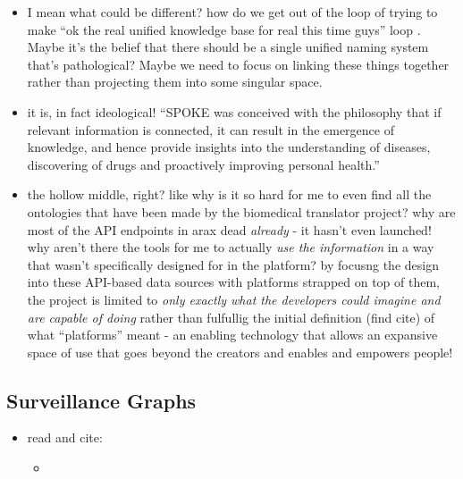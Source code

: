 \begin{itemize}

\item
  I mean what could be different? how do we get out of the loop of
  trying to make ``ok the real unified knowledge base for real this time
  guys'' loop \cite{hoytUnifyingIdentificationBiomedical2022} .
  Maybe it's the belief that there should be a single unified naming
  system that's pathological? Maybe we need to focus on linking these
  things together rather than projecting them into some singular space.
\item
  it is, in fact ideological! ``SPOKE was conceived with the philosophy
  that if relevant information is connected, it can result in the
  emergence of knowledge, and hence provide insights into the
  understanding of diseases, discovering of drugs and proactively
  improving personal health.'' \cite{morrisScalablePrecisionMedicine2023} 
\item
  the hollow middle, right? like why is it so hard for me to even find
  all the ontologies that have been made by the biomedical translator
  project? why are most of the API endpoints in arax dead \emph{already}
  - it hasn't even launched! why aren't there the tools for me to
  actually \emph{use the information} in a way that wasn't specifically
  designed for in the platform? by focusng the design into these
  API-based data sources with platforms strapped on top of them, the
  project is limited to \emph{only exactly what the developers could
  imagine and are capable of doing} rather than fulfullig the initial
  definition (find cite) of what ``platforms'' meant - an enabling
  technology that allows an expansive space of use that goes beyond the
  creators and enables and empowers people!
\end{itemize}

\hypertarget{surveillance-graphs}{%
\subsection{Surveillance Graphs}\label{surveillance-graphs}}

\begin{itemize}

\item
  read and cite:

  \begin{itemize}
  
  \item
    \cite{allhutterWorkingOntologistsHighQuality2019} 
  \end{itemize}
\end{itemize}

